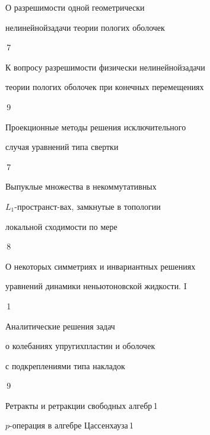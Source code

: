 

{О разрешимости одной геометрически


нелинейной\newline задачи теории пологих оболочек}{\No\,7}




{К вопросу разрешимости физически нелинейной\newline задачи 


теории пологих оболочек при конечных перемещениях}{\No\,9}




{Проекционные методы решения исключительного\newline


случая уравнений типа свертки}{\No\,7}




{Выпуклые множества в некоммутативных 


$L_1$-пространст-\newline вах, замкнутые в топологии 


локальной сходимости по мере}{\No\,8}




{О некоторых симметриях и инвариантных решениях\newline


уравнений динамики неньютоновской жидкости. I}{\No\,1}






{Аналитические решения задач


о колебаниях упругих\newline пластин и оболочек


с подкреплениями типа накладок}{\No\,9}




{Ретракты и ретракции свободных алгебр}{\No\,1}




{$p$-операция в алгебре Цассенхауза}{\No\,1}




